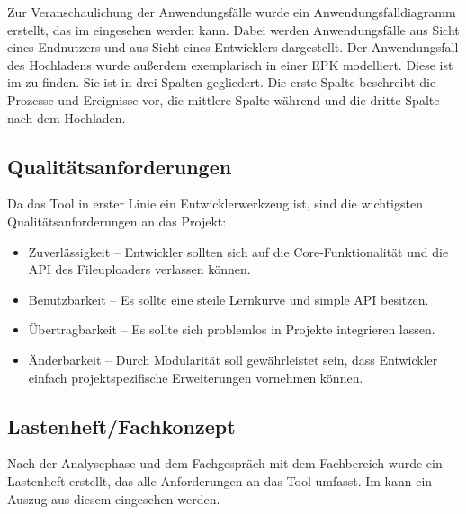 Zur Veranschaulichung der Anwendungsfälle wurde ein Anwendungsfalldiagramm erstellt, das im  eingesehen werden kann. Dabei werden Anwendungsfälle aus Sicht eines Endnutzers und aus Sicht eines Entwicklers dargestellt. Der Anwendungsfall des Hochladens wurde außerdem exemplarisch in einer \ac{EPK} modelliert. Diese ist im  zu finden. Sie ist in drei Spalten gegliedert. Die erste Spalte beschreibt die Prozesse und Ereignisse vor, die mittlere Spalte während und die dritte Spalte nach dem Hochladen.


\subsection{Qualitätsanforderungen}
\label{sec:Qualitaetsanforderungen}

Da das Tool in erster Linie ein Entwicklerwerkzeug ist, sind die wichtigsten Qualitätsanforderungen an das Projekt:
\begin{itemize}
	\item Zuverlässigkeit – Entwickler sollten sich auf die Core-Funktionalität und die API des Fileuploaders verlassen können.
	\item Benutzbarkeit – Es sollte eine steile Lernkurve und simple API besitzen.
	\item Übertragbarkeit – Es sollte sich problemlos in Projekte integrieren lassen.
	\item Änderbarkeit – Durch Modularität soll gewährleistet sein, dass Entwickler einfach projektspezifische Erweiterungen vornehmen können.
\end{itemize}


\subsection{Lastenheft/Fachkonzept}
\label{sec:Lastenheft}

Nach der Analysephase und dem Fachgespräch mit dem Fachbereich wurde ein Lastenheft erstellt, das alle Anforderungen an das Tool umfasst. Im  kann ein Auszug aus diesem eingesehen werden.